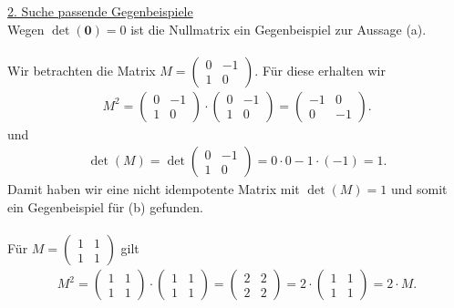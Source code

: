 \underline{2. Suche passende Gegenbeispiele}\\
Wegen $ \det (\textbf{0}) = 0 $ ist die Nullmatrix ein Gegenbeispiel zur Aussage (a).\\
\\
Wir betrachten die Matrix $ M = \begin{pmatrix}
0 & -1 \\
1 & 0
\end{pmatrix} $. Für diese erhalten wir 
\begin{align*}
M^2 
= 
\begin{pmatrix}
0 & -1 \\
1 & 0
\end{pmatrix}
\cdot
\begin{pmatrix}
0 & -1 \\
1 & 0
\end{pmatrix}
=
\begin{pmatrix}
-1 & 0 \\
0 & -1
\end{pmatrix}.
\end{align*}
und 
\begin{align*}
\det(M) = \det \begin{pmatrix}
0 & -1 \\
1 & 0
\end{pmatrix}
 = 0 \cdot 0 - 1 \cdot(-1) = 1.
\end{align*}
Damit haben wir eine nicht idempotente Matrix mit $ \det(M) = 1 $ und somit ein Gegenbeispiel für (b) gefunden.\\
\\
Für $ M = 
\begin{pmatrix}
1 & 1 \\
1 & 1
\end{pmatrix}  $ gilt
\begin{align*}
M^2 = 
\begin{pmatrix}
1 & 1 \\
1 & 1
\end{pmatrix}
\cdot 
\begin{pmatrix}
1 & 1 \\
1 & 1
\end{pmatrix}
= 
\begin{pmatrix}
2 & 2 \\
2 & 2
\end{pmatrix}
 = 
 2 \cdot 
 \begin{pmatrix}
 1 & 1 \\
 1 & 1
 \end{pmatrix}
 = 2 \cdot M.
\end{align*}
